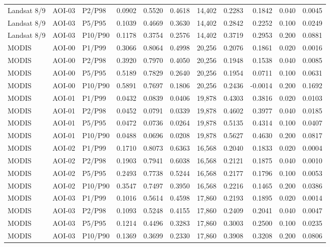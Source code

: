 \begin{landscape}
\begin{longtable}{lllrrrrrrrr}
Landsat 8/9 & AOI-03 & P2/P98 & 0.0902 & 0.5520 & 0.4618 & 14,402 & 0.2283 & 0.1842 & 0.040 & 0.0045 \\
Landsat 8/9 & AOI-03 & P5/P95 & 0.1039 & 0.4669 & 0.3630 & 14,402 & 0.2842 & 0.2252 & 0.100 & 0.0249 \\
Landsat 8/9 & AOI-03 & P10/P90 & 0.1178 & 0.3754 & 0.2576 & 14,402 & 0.3719 & 0.2953 & 0.200 & 0.0881 \\
MODIS & AOI-00 & P1/P99 & 0.3066 & 0.8064 & 0.4998 & 20,256 & 0.2076 & 0.1861 & 0.020 & 0.0016 \\
MODIS & AOI-00 & P2/P98 & 0.3920 & 0.7970 & 0.4050 & 20,256 & 0.1948 & 0.1538 & 0.040 & 0.0085 \\
MODIS & AOI-00 & P5/P95 & 0.5189 & 0.7829 & 0.2640 & 20,256 & 0.1954 & 0.0711 & 0.100 & 0.0631 \\
MODIS & AOI-00 & P10/P90 & 0.5891 & 0.7697 & 0.1806 & 20,256 & 0.2436 & -0.0014 & 0.200 & 0.1692 \\
MODIS & AOI-01 & P1/P99 & 0.0432 & 0.0839 & 0.0406 & 19,878 & 0.4303 & 0.3816 & 0.020 & 0.0103 \\
MODIS & AOI-01 & P2/P98 & 0.0452 & 0.0791 & 0.0339 & 19,878 & 0.4602 & 0.3977 & 0.040 & 0.0185 \\
MODIS & AOI-01 & P5/P95 & 0.0472 & 0.0736 & 0.0264 & 19,878 & 0.5135 & 0.4314 & 0.100 & 0.0407 \\
MODIS & AOI-01 & P10/P90 & 0.0488 & 0.0696 & 0.0208 & 19,878 & 0.5627 & 0.4630 & 0.200 & 0.0817 \\
MODIS & AOI-02 & P1/P99 & 0.1710 & 0.8073 & 0.6363 & 16,568 & 0.2040 & 0.1833 & 0.020 & 0.0004 \\
MODIS & AOI-02 & P2/P98 & 0.1903 & 0.7941 & 0.6038 & 16,568 & 0.2121 & 0.1875 & 0.040 & 0.0010 \\
MODIS & AOI-02 & P5/P95 & 0.2493 & 0.7738 & 0.5244 & 16,568 & 0.2177 & 0.1796 & 0.100 & 0.0053 \\
MODIS & AOI-02 & P10/P90 & 0.3547 & 0.7497 & 0.3950 & 16,568 & 0.2216 & 0.1465 & 0.200 & 0.0386 \\
MODIS & AOI-03 & P1/P99 & 0.1016 & 0.5614 & 0.4598 & 17,860 & 0.2193 & 0.1895 & 0.020 & 0.0014 \\
MODIS & AOI-03 & P2/P98 & 0.1093 & 0.5248 & 0.4155 & 17,860 & 0.2409 & 0.2041 & 0.040 & 0.0047 \\
MODIS & AOI-03 & P5/P95 & 0.1214 & 0.4496 & 0.3283 & 17,860 & 0.3003 & 0.2500 & 0.100 & 0.0235 \\
MODIS & AOI-03 & P10/P90 & 0.1369 & 0.3699 & 0.2330 & 17,860 & 0.3908 & 0.3208 & 0.200 & 0.0806 \\

\end{longtable}
\end{landscape}
